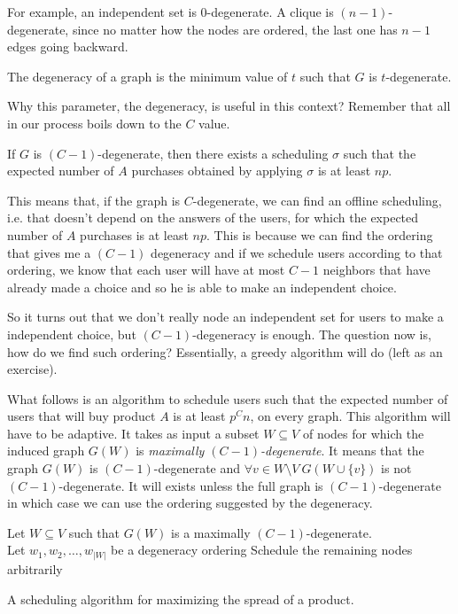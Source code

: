 For example, an independent set is $0$-degenerate. A clique is $(n-1)$-degenerate, since no matter how the nodes are ordered, the last one has $n-1$ edges going backward.

\begin{defn}[degeneracy]
	The degeneracy of a graph is the minimum value of $t$ such that $G$ is $t$-degenerate.
\end{defn}

Why this parameter, the degeneracy, is useful in this context? Remember that all in our process boils down to the $C$ value. 

\begin{claim}
	If $G$ is $(C-1)$-degenerate, then there exists a scheduling $\sigma$ such that the expected number of $A$ purchases obtained by applying $\sigma$ is at least $np$.
\end{claim} 

This means that, if the graph is $C$-degenerate, we can find an offline scheduling, i.e. that doesn't depend on the answers of the users, for which the expected number of $A$ purchases is at least $np$. This is because we can find the ordering that gives me a $(C-1)$ degeneracy and if we schedule users according to that ordering, we know that each user will have at most $C-1$ neighbors that have already made a choice and so he is able to make an independent choice.

So it turns out that we don't really node an independent set for users to make a independent choice, but $(C-1)$-degeneracy is enough. The question now is, how do we find such ordering? Essentially, a greedy algorithm will do (left as an exercise).

What follows is an algorithm to schedule users such that the expected number of users that will buy product $A$ is at least $p^Cn$, on every graph. This algorithm will have to be adaptive. It takes as input a subset $W \subseteq V$ of nodes for which the induced graph $G(W)$ is \emph{maximally $(C-1)$-degenerate}. It means that the graph $G(W)$ is $(C-1)$-degenerate and $\forall  v \in W\setminus V\ G(W \cup \{v\})$ is not $(C-1)$-degenerate. It will exists unless the full graph is $(C-1)$-degenerate in which case we can use the ordering suggested by the degeneracy.

\begin{algorithm}
	Let $W \subseteq V$ such that $G(W)$ is a maximally $(C-1)$-degenerate.\\
	Let $w_1, w_2, \ldots, w_{|W|}$ be a degeneracy ordering\;
	Schedule the remaining nodes arbitrarily\;
	\vspace{10pt}
	\caption{A scheduling algorithm for maximizing the spread of a product.}
	\label{alg:arth:schedule}
\end{algorithm}


